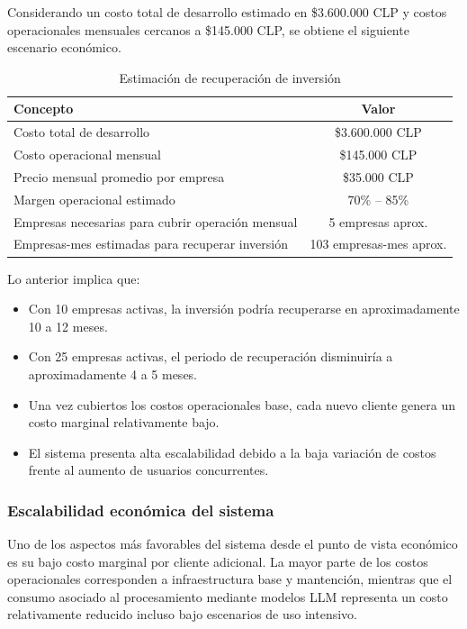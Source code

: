 Considerando un costo total de desarrollo estimado en \$3.600.000 CLP y costos operacionales mensuales cercanos a \$145.000 CLP, se obtiene el siguiente escenario económico.

\begin{table}[H]
\centering
\begin{tabular}{|l|c|}
\hline
Concepto & Valor \\ \hline
Costo total de desarrollo & \$3.600.000 CLP \\ \hline
Costo operacional mensual & \$145.000 CLP \\ \hline
Precio mensual promedio por empresa & \$35.000 CLP \\ \hline
Margen operacional estimado & 70\% -- 85\% \\ \hline
Empresas necesarias para cubrir operación mensual & 5 empresas aprox. \\ \hline
Empresas-mes estimadas para recuperar inversión & 103 empresas-mes aprox. \\ \hline
\end{tabular}
\caption{Estimación de recuperación de inversión}
\end{table}

Lo anterior implica que:

\begin{itemize}
    \item Con 10 empresas activas, la inversión podría recuperarse en aproximadamente 10 a 12 meses.
    \item Con 25 empresas activas, el periodo de recuperación disminuiría a aproximadamente 4 a 5 meses.
    \item Una vez cubiertos los costos operacionales base, cada nuevo cliente genera un costo marginal relativamente bajo.
    \item El sistema presenta alta escalabilidad debido a la baja variación de costos frente al aumento de usuarios concurrentes.
\end{itemize}

\subsubsection{Escalabilidad económica del sistema}

Uno de los aspectos más favorables del sistema desde el punto de vista económico es su bajo costo marginal por cliente adicional. La mayor parte de los costos operacionales corresponden a infraestructura base y mantención, mientras que el consumo asociado al procesamiento mediante modelos LLM representa un costo relativamente reducido incluso bajo escenarios de uso intensivo.

